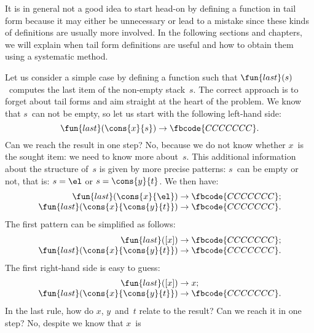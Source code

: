 It is in general not a good idea to start head\hyp{}on by defining a
function in tail form because it may either be unnecessary or lead to
a mistake since these kinds of definitions are usually more
involved. In the following sections and chapters, we will explain when
tail form definitions are useful and how to obtain them using a
systematic method.

Let us consider a simple case by defining a function  such
that \(\fun{last}(s)\)~computes the last item of the non\hyp{}empty
stack~\(s\). The correct approach is to forget about tail forms and
aim straight at the heart of the problem. We know that \(s\)~can not
be empty, so let us start with the following left\hyp{}hand side:
\begin{equation*}
\fun{last}(\cons{x}{s}) \rightarrow \fbcode{CCCCCCC}.
\end{equation*}
Can we reach the result in one step? No, because we do not know
whether \(x\)~is the sought item: we need to know more
about~\(s\). This additional information about the structure of~\(s\)
is given by more precise patterns: \(s\)~can be empty or not, that is:
\(s = \el\) or \(s=\cons{y}{t}\). We then have:
\begin{equation*}
\begin{array}{r@{\;}c@{\;}l}
\fun{last}(\cons{x}{\el}) & \rightarrow & \fbcode{CCCCCCC};\\
\fun{last}(\cons{x}{\cons{y}{t}}) & \rightarrow & \fbcode{CCCCCCC}.
\end{array}
\end{equation*}
The first pattern can be simplified as follows:
\begin{equation*}
\begin{array}{r@{\;}c@{\;}l}
\fun{last}([x]) & \rightarrow & \fbcode{CCCCCCC};\\
\fun{last}(\cons{x}{\cons{y}{t}}) & \rightarrow & \fbcode{CCCCCCC}.
\end{array}
\end{equation*}
The first right\hyp{}hand side is easy to guess:
\begin{equation*}
\begin{array}{r@{\;}c@{\;}l}
\fun{last}([x]) & \rightarrow & x;\\
\fun{last}(\cons{x}{\cons{y}{t}}) & \rightarrow & \fbcode{CCCCCCC}.
\end{array}
\end{equation*}
In the last rule, how do \(x\), \(y\)~and~\(t\) relate to the result?
Can we reach it in one step? No, despite we know that \(x\)~is
